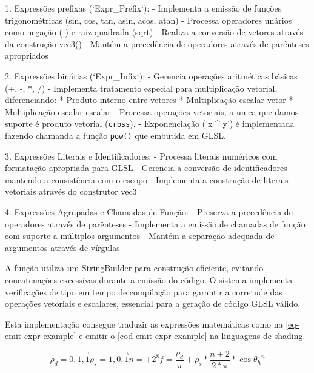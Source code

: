 1. Expressões prefixas (`Expr_Prefix`):
   - Implementa a emissão de funções trigonométricas (sin, cos, tan, asin, acos, atan)
   - Processa operadores unários como negação (-) e raiz quadrada (sqrt)
   - Realiza a conversão de vetores através da construção vec3()
   - Mantém a precedência de operadores através de parênteses apropriados

2. Expressões binárias (`Expr_Infix`):
   - Gerencia operações aritméticas básicas (+, -, *, /)
   - Implementa tratamento especial para multiplicação vetorial, diferenciando:
     * Produto interno entre vetores
     * Multiplicação escalar-vetor
     * Multiplicação escalar-escalar
   - Processa operações vetoriais, a unica que damos suporte é produto vetorial (\verb`cross`).
   - Exponenciação (\veb'x ^ y') é implementada fazendo chamanda a função \verb`pow()` que embutida em GLSL.

3. Expressões Literais e Identificadores:
   - Processa literais numéricos com formatação apropriada para GLSL
   - Gerencia a conversão de identificadores mantendo a consistência com o escopo
   - Implementa a construção de literais vetoriais através do construtor vec3

4. Expressões Agrupadas e Chamadas de Função:
   - Preserva a precedência de operadores através de parênteses
   - Implementa a emissão de chamadas de função com suporte a múltiplos argumentos
   - Mantém a separação adequada de argumentos através de vírgulas

A função utiliza um StringBuilder para construção eficiente, evitando concatenações excessivas durante a emissão do código. O sistema implementa verificações de tipo em tempo de compilação para garantir a corretude das operações vetoriais e escalares, essencial para a geração de código GLSL válido.

Esta implementação consegue traduzir as expressões matemáticas como na \autoref{eq-emit-expr-example} e emitir o \autoref{cod-emit-expr-example} na linguagens de shading.

\begin{subequations}
\begin{equation}
    \rho_{d} = \vec{0,1,1}
\end{equation}

\begin{equation}
    \rho_{s} = \vec{1,0,1}
\end{equation}

\begin{equation}
    n = +2^8
\end{equation}

\begin{equation}
f = \frac{\rho_{d}}{\pi} + \rho_{s} * \frac{n+2}{2*\pi} *
\cos{\theta_{h}}^{n}
\end{equation}
\end{subequations}

